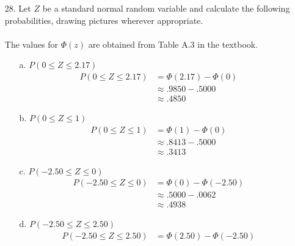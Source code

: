 \documentclass[letterpaper,12pt]{article}
\begin{document}
\maketitle

\begin{enumerate}
  \item[28.]
    Let $Z$ be a standard normal random variable and calculate the following probabilities, drawing pictures wherever appropriate. \\
    \\
    The values for $\Phi(z)$ are obtained from Table A.3 in the textbook.
    \begin{enumerate}
      \item[a.]
        $P(0 \le Z \le 2.17)$
        \begin{align*}
          P(0 \le Z \le 2.17) &= \Phi(2.17) - \Phi(0) \\
          &\approx .9850 - .5000 \\
          &\approx .4850
        \end{align*}
        \begin{center}
        \end{center}
      \item[b.]
        $P(0 \le Z \le 1)$
        \begin{align*}
          P(0 \le Z \le 1) &= \Phi(1) - \Phi(0) \\
          &\approx .8413 - .5000 \\
          &\approx .3413
        \end{align*}
        \begin{center}
        \end{center}
      \item[c.]
        $P(-2.50 \le Z \le 0)$
        \begin{align*}
          P(-2.50 \le Z \le 0) &= \Phi(0) - \Phi(-2.50) \\
          &\approx .5000 - .0062 \\
          &\approx .4938
        \end{align*}
        \begin{center}
        \end{center}
      \item[d.]
        $P(-2.50 \le Z \le 2.50)$
        \begin{align*}
          P(-2.50 \le Z \le 2.50) &= \Phi(2.50) - \Phi(-2.50) \\

\end{align*}
\end{enumerate}
\end{enumerate}
\end{document}
